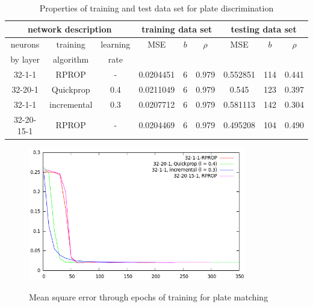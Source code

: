 \documentclass[times, utf8, zavrsni]{fer}
\begin{document}
\begin{table}[h]
\begin{center} {\footnotesize
\begin{tabular}{|c|c|c||c|c|c||c|c|c|}
\hline
\multicolumn{3}{|c||}{network description} & 
\multicolumn{3}{c||}{training data set} & 
\multicolumn{3}{c|}{testing data set} \\
\hline
neurons & training & learning & MSE & $b$ & $\rho$ & MSE & $b$ & $\rho$ \\ 
by layer & algorithm & rate    & & & & & & \\
\hline

32-1-1 & RPROP & - & 
0.0204451 & 6 & 0.979 & 
0.552851 & 114 & 0.441 \\

32-20-1 & Quickprop & 0.4 & 
0.0211049 & 6 & 0.979 & 
0.545 & 123 & 0.397 \\

32-1-1 & incremental & 0.3 & 
0.0207712 & 6 & 0.979 & 
0.581113 & 142 & 0.304 \\

32-20-15-1 & RPROP & - & 
0.0204469 & 6 & 0.979 & 
0.495208 & 104 & 0.490 \\

\hline
\end{tabular} }
\end{center}
\caption{\footnotesize Properties of training and test data set for plate
discrimination}
\label{table:plate-training-results}
\end{table}

\begin{figure}[htb]
\caption{Mean square error through epochs of training for plate matching}
\centering
\includegraphics[width=0.85\textwidth]{images/plate-train-mse}
\label{fig:plate-train-mse}
\end{figure}
\end{document}
